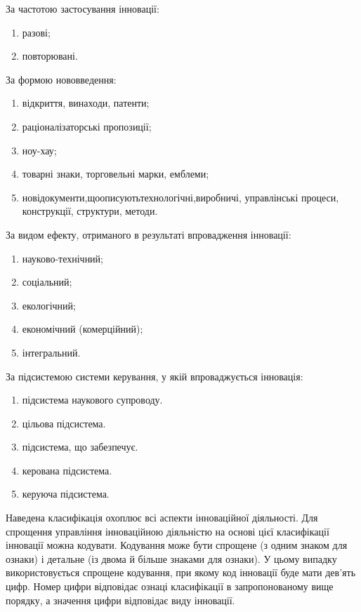За частотою застосування інновації:

\begin{enumerate}
	\item разові;
	\item повторювані.
\end{enumerate}

За формою нововведення:

\begin{enumerate}
	\item відкриття, винаходи, патенти;
	\item раціоналізаторські пропозиції;
	\item ноу-хау;
	\item товарні знаки, торговельні марки, емблеми;
	\item нові\hfill документи,\hfill що\hfill описують\hfill технологічні,\hfill виробничі,\newline \hspace*{-18mm} управлінські процеси, конструкції, структури, методи.
\end{enumerate}

За видом ефекту, отриманого в результаті впровадження інновації:

\begin{enumerate}
	\item науково-технічний;
	\item соціальний;
	\item екологічний;
	\item економічний (комерційний);
	\item інтегральний.
\end{enumerate}

За підсистемою системи керування, у якій впроваджується інновація:

\begin{enumerate}
	\item підсистема наукового супроводу.
	\item цільова підсистема.
	\item підсистема, що забезпечує.
	\item керована підсистема.
	\item керуюча підсистема.
\end{enumerate}

Наведена класифікація охоплює всі аспекти інноваційної діяльності. Для спрощення управління інноваційною діяльністю на основі цієї класифікації інновації можна кодувати. Кодування може бути спрощене (з одним знаком для ознаки) і детальне (із двома й більше знаками для ознаки). У цьому випадку використовується спрощене кодування, при якому код інновації буде мати дев'ять цифр. Номер цифри відповідає ознаці класифікації в запропонованому вище порядку, а значення цифри відповідає виду інновації.

